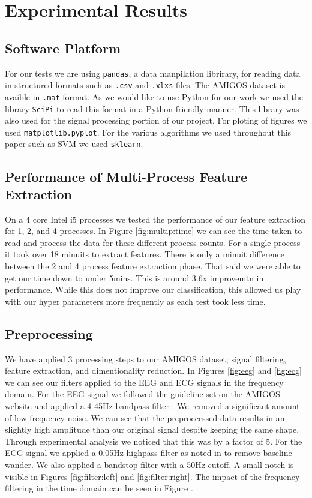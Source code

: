 \section{Experimental Results}
\label{sec:experimental_results}
\subsection{Software Platform}
For our tests we are using \texttt{pandas},
a data manpilation librirary,
for reading data in structured formats such as
\texttt{.csv} and \texttt{.xlxs} files.
The AMIGOS dataset is avaible in \texttt{.mat} format.
As we would like to use Python for our work we used
the library \texttt{SciPi} to read this format in a Python friendly manner.
This library was also used for the signal processing portion of our project.
For ploting of figures we used \texttt{matplotlib.pyplot}.
For the various algorithms we used throughout this paper such as SVM we
used \texttt{sklearn}.

\subsection{Performance of Multi-Process Feature Extraction}
On a 4 core Intel i5 processes we tested the performance of our feature extraction
for 1, 2, and 4 processes.
In Figure \ref{fig:multip:time} we can see the time taken to read and process
the data for these different process counts.
For a single process it took over 18 minuits to extract features.
There is only a minuit difference between the 2 and 4 process feature extraction phase.
That said we were able to get our time down to under 5mins.
This is around 3.6x improvemtn in performance.
While this does not improve our classification, this allowed us play
with our hyper parameters more frequently as each test took less time.


\subsection{Preprocessing}

We have applied 3 processing steps to our AMIGOS dataset;
signal filtering, feature extraction, and dimentionality reduction.
In Figures \ref{fig:eeg} and \ref{fig:ecg}
we can see our filters applied to the EEG and ECG signals in the frequency domain.
For the EEG signal we followed the guideline set on the AMIGOS
website and applied a 4-45Hz bandpass filter \cite{AMIGOS:2018}.
We removed a significant amount of low frequency noise.
We can see that the preproccessed data results
in an slightly high amplitude than our original signal despite keeping the same shape.
Through experimental analysis we noticed that this was by a factor of 5.
For the ECG signal we applied a 0.05Hz highpass filter as noted in
\cite{SantamariaGranados:2019}
to remove baseline wander.
We also applied a bandstop filter with a 50Hz cutoff.
A small notch is visible in
Figures \ref{fig:filter:left} and \ref{fig:filter:right}.
The impact of the frequency filtering in the time domain can be seen in Figure
\label{fig:ecg:time}.

